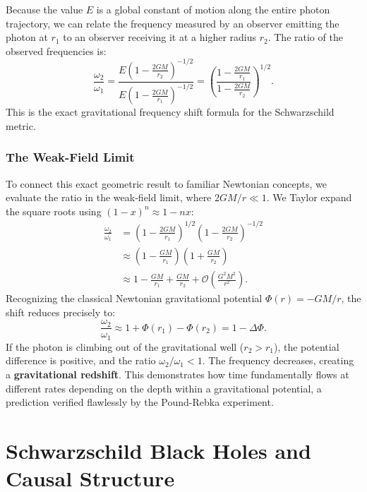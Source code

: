 \documentclass[11pt, a4paper]{report}
\begin{document}
Because the value $E$ is a global constant of motion along the entire photon trajectory, we can relate the frequency measured by an observer emitting the photon at $r_{1}$ to an observer receiving it at a higher radius $r_{2}$. The ratio of the observed frequencies is:
\begin{equation}
\frac{\omega_{2}}{\omega_{1}} = \frac{ E \left(1-\frac{2GM}{r_{2}}\right)^{-1/2} }{ E \left(1-\frac{2GM}{r_{1}}\right)^{-1/2} } = \left( \frac{1-\frac{2GM}{r_{1}}}{1-\frac{2GM}{r_{2}}} \right)^{1/2}.
\end{equation}
This is the exact gravitational frequency shift formula for the Schwarzschild metric.

\subsubsection*{The Weak-Field Limit}
To connect this exact geometric result to familiar Newtonian concepts, we evaluate the ratio in the weak-field limit, where $2GM/r \ll 1$. We Taylor expand the square roots using $(1-x)^{n} \approx 1 - nx$:
\begin{align}
\frac{\omega_{2}}{\omega_{1}} &= \left(1-\frac{2GM}{r_{1}}\right)^{1/2} \left(1-\frac{2GM}{r_{2}}\right)^{-1/2} \nonumber \\
&\approx \left(1 - \frac{GM}{r_{1}}\right) \left(1 + \frac{GM}{r_{2}}\right) \nonumber \\
&\approx 1 - \frac{GM}{r_{1}} + \frac{GM}{r_{2}} + \mathcal{O}\left(\frac{G^{2}M^{2}}{r^{2}}\right).
\end{align}
Recognizing the classical Newtonian gravitational potential $\Phi(r) = -GM/r$, the shift reduces precisely to:
\begin{equation}
\frac{\omega_{2}}{\omega_{1}} \approx 1 + \Phi(r_{1}) - \Phi(r_{2}) = 1 - \Delta\Phi.
\end{equation}
If the photon is climbing out of the gravitational well ($r_{2} > r_{1}$), the potential difference is positive, and the ratio $\omega_{2}/\omega_{1} < 1$. The frequency decreases, creating a \textbf{gravitational redshift}. This demonstrates how time fundamentally flows at different rates depending on the depth within a gravitational potential, a prediction verified flawlessly by the Pound-Rebka experiment.

\section{Schwarzschild Black Holes and Causal Structure}
\end{document}
